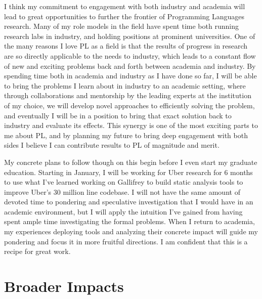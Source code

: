 \documentclass{nsf-grfp}
\begin{document}
I think my commitment to engagement with both industry and academia will lead to great opportunities to further the frontier of Programming Languages research. Many of my role models in the field have spent time both running research labs in industry, and holding positions at prominent universities. One of the many reasons I love PL as a field is that the results of progress in research are so directly applicable to the needs to industry, which leads to a constant flow of new and exciting problems back and forth between academia and industry. By spending time both in academia and industry as I have done so far, I will be able to bring the problems I learn about in industry to an academic setting, where through collaborations and mentorship by the leading experts at the institution of my choice, we will develop novel approaches to efficiently solving the problem, and eventually I will be in a position to bring that exact solution back to industry and evaluate its effects. This synergy is one of the most exciting parts to me about PL, and by planning my future to bring deep engagement with both sides I believe I can contribute results to PL of magnitude and merit.

My concrete plans to follow though on this begin before I even start my graduate education. Starting in January, I will be working for Uber research for 6 months to use what I've learned working on Gallifrey to build static analysis tools to improve Uber's 30 million line codebase. I will not have the same amount of devoted time to pondering and speculative investigation that I would have in an academic environment, but I will apply the intuition I've gained from having spent ample time investigating the formal problems. When I return to academia, my experiences deploying tools and analyzing their concrete impact will guide my pondering and focus it in more fruitful directions. I am confident that this is a recipe for great work.

\section*{Broader Impacts}
\end{document}
